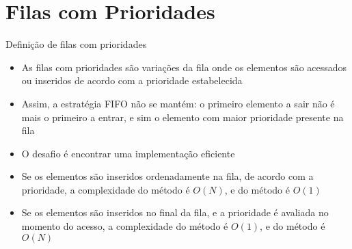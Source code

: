 \section{Filas com Prioridades}

\begin{frame}[fragile]{Definição de filas com prioridades}

    \begin{itemize}
        \item As filas com prioridades são variações da fila onde os elementos são
            acessados ou inseridos de acordo com a prioridade estabelecida

        \item Assim, a estratégia FIFO não se mantém: o primeiro elemento a sair não é mais
            o primeiro a entrar, e sim o elemento com maior prioridade presente na fila

        \item O desafio é encontrar uma implementação eficiente

        \item Se os elementos são inseridos ordenadamente na fila, de acordo com a prioridade,
            a complexidade do método  é $O(N)$, e do método  é 
            $O(1)$

        \item Se os elementos são inseridos no final da fila, e a prioridade é avaliada no
            momento do acesso, a complexidade do método  é $O(1)$, e do método 
             é $O(N)$
    \end{itemize}

\end{frame}

